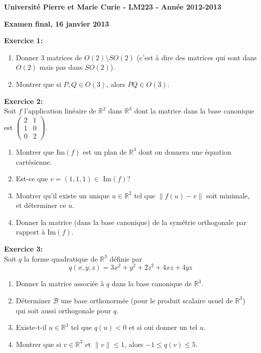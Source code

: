 \documentclass[a4paper, 11pt]{article}
\theoremstyle{plain}
\newcommand{\R}{\mathbb{R}}
\begin{document}
\noindent
\large
\textbf{Universit\'e Pierre et Marie Curie 
 - LM223 -
Ann\'ee 2012-2013}\\

\begin{center}
\Large
\textbf{Examen final, 16 janvier 2013}
\end{center}
\normalsize

\medskip
\noindent
\textbf{Exercice 1:}\\
\begin{enumerate}
\item
Donner 3 matrices de $O(2) \setminus SO(2)$ (c'est à dire des 
matrices qui sont dans $O(2)$ mais pas dans $SO(2)$). 

\item Montrer que si $P,Q \in O(3)$, alors 
$PQ \in O(3)$.

\end{enumerate}

\bigskip
\noindent
\textbf{Exercice 2:}\\
Soit $f$ l'application linéaire de  $\R^2$ dans $\R^3$ dont la matrice dans la 
base canonique est 
$\begin{pmatrix}
2&1\\
1&0\\
0&2
\end{pmatrix}
$. 
\begin{enumerate}

\item Montrer que Im$(f)$ est un plan de $\R^3$ dont on donnera une équation 
cartésienne.
\item 
Est-ce que 
$v=(1,1,1) \in$ Im$(f)$?
\item Montrer qu'il existe un unique $u \in \R^2$ tel que 
$\| f(u) - v\|$ soit minimale, et déterminer ce $u$. 
\item Donner la matrice (dans la base canonique) de la symétrie orthogonale par rapport à 
Im$(f)$.
\end{enumerate}
\medskip
\noindent
\textbf{Exercice 3:}\\
Soit $q$ la forme quadratique de 
$\R^3$ définie par 
\[ q(x,y,z) = 3x^2 +y^2 +2z^2 +4xz +4yz\]
\begin{enumerate}
\item 
Donner la matrice associée à $q$ dans la base canonique de $\R^3$.
\item 
Déterminer $\mathcal{B}$ une base orthonormée (pour le produit scalaire usuel de $\R^3$) 
qui soit aussi orthogonale pour $q$. 

\item Existe-t-il $u\in \R^3$ tel que 
$q(u)<0$ et si oui donner un tel $u$.

\item 
Montrer que si $v\in \R^3$ et $\|v\| \leq 1$, alors 
$-1 \leq q(v) \leq 5$.

\end{enumerate}
\end{document}
